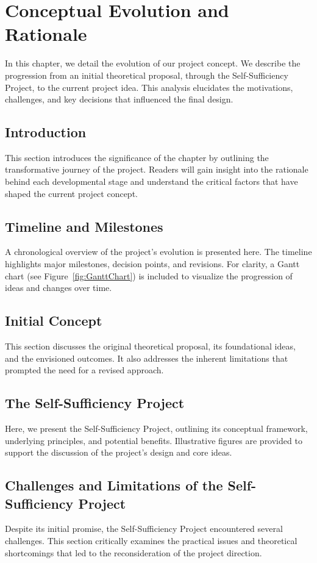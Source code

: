 \chapter{Conceptual Evolution and Rationale}
\label{chap:Conceptual_Evolution_and_Rationale}

In this chapter, we detail the evolution of our project concept. We describe the progression from an initial theoretical proposal, through the Self-Sufficiency Project, to the current project idea. This analysis elucidates the motivations, challenges, and key decisions that influenced the final design.

\section{Introduction}
This section introduces the significance of the chapter by outlining the transformative journey of the project. Readers will gain insight into the rationale behind each developmental stage and understand the critical factors that have shaped the current project concept.

\section{Timeline and Milestones}
A chronological overview of the project’s evolution is presented here. The timeline highlights major milestones, decision points, and revisions. For clarity, a Gantt chart (see Figure~\ref{fig:GanttChart}) is included to visualize the progression of ideas and changes over time.

\section{Initial Concept}
This section discusses the original theoretical proposal, its foundational ideas, and the envisioned outcomes. It also addresses the inherent limitations that prompted the need for a revised approach.

\section{The Self-Sufficiency Project}
Here, we present the Self-Sufficiency Project, outlining its conceptual framework, underlying principles, and potential benefits. Illustrative figures are provided to support the discussion of the project’s design and core ideas.

\section{Challenges and Limitations of the Self-Sufficiency Project}
Despite its initial promise, the Self-Sufficiency Project encountered several challenges. This section critically examines the practical issues and theoretical shortcomings that led to the reconsideration of the project direction.

